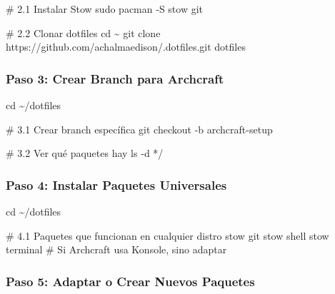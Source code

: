 \documentclass[
  doc,
  floatsintext,
  longtable,
  a4paper,
  nolmodern,
  notxfonts,
  notimes,
  12pt,
  colorlinks=true,linkcolor=blue,citecolor=blue,urlcolor=blue]{apa7}
\newenvironment{Shaded}{\begin{snugshade}}{\end{snugshade}}
\newcommand{\AttributeTok}[1]{\textcolor[rgb]{0.40,0.45,0.13}{#1}}
\newcommand{\BuiltInTok}[1]{\textcolor[rgb]{0.00,0.23,0.31}{#1}}
\newcommand{\CommentTok}[1]{\textcolor[rgb]{0.37,0.37,0.37}{#1}}
\newcommand{\ExtensionTok}[1]{\textcolor[rgb]{0.00,0.23,0.31}{#1}}
\newcommand{\FunctionTok}[1]{\textcolor[rgb]{0.28,0.35,0.67}{#1}}
\newcommand{\NormalTok}[1]{\textcolor[rgb]{0.00,0.23,0.31}{#1}}
\newcommand{\PreprocessorTok}[1]{\textcolor[rgb]{0.68,0.00,0.00}{#1}}
\begin{document}
\begin{Shaded}
\begin{Highlighting}[]
\CommentTok{\# 2.1 Instalar Stow}
\FunctionTok{sudo}\NormalTok{ pacman }\AttributeTok{{-}S}\NormalTok{ stow git}

\CommentTok{\# 2.2 Clonar dotfiles}
\BuiltInTok{cd}\NormalTok{ \textasciitilde{}}
\FunctionTok{git}\NormalTok{ clone https://github.com/achalmaedison/.dotfiles.git dotfiles}
\end{Highlighting}
\end{Shaded}

\subsubsection{Paso 3: Crear Branch para
Archcraft}\label{paso-3-crear-branch-para-archcraft}

\begin{Shaded}
\begin{Highlighting}[]
\BuiltInTok{cd}\NormalTok{ \textasciitilde{}/dotfiles}

\CommentTok{\# 3.1 Crear branch específica}
\FunctionTok{git}\NormalTok{ checkout }\AttributeTok{{-}b}\NormalTok{ archcraft{-}setup}

\CommentTok{\# 3.2 Ver qué paquetes hay}
\FunctionTok{ls} \AttributeTok{{-}d} \PreprocessorTok{*}\NormalTok{/}
\end{Highlighting}
\end{Shaded}

\subsubsection{Paso 4: Instalar Paquetes
Universales}\label{paso-4-instalar-paquetes-universales}

\begin{Shaded}
\begin{Highlighting}[]
\BuiltInTok{cd}\NormalTok{ \textasciitilde{}/dotfiles}

\CommentTok{\# 4.1 Paquetes que funcionan en cualquier distro}
\ExtensionTok{stow}\NormalTok{ git}
\ExtensionTok{stow}\NormalTok{ shell}
\ExtensionTok{stow}\NormalTok{ terminal  }\CommentTok{\# Si Archcraft usa Konsole, sino adaptar}
\end{Highlighting}
\end{Shaded}

\subsubsection{Paso 5: Adaptar o Crear Nuevos
Paquetes}\label{paso-5-adaptar-o-crear-nuevos-paquetes}
\end{document}
